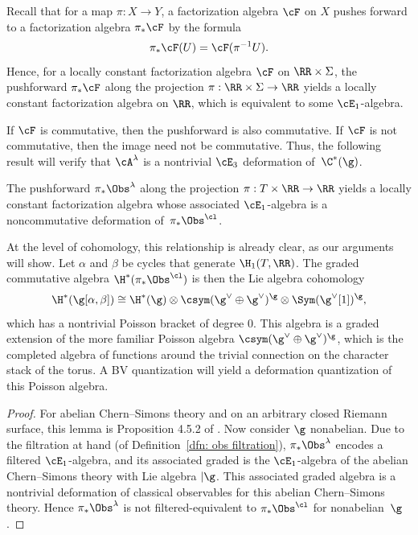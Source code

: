 \documentclass[10pt]{amsart}
\begin{document}
Recall that for a map $\pi: X \to Y$, 
a factorization algebra $\cF$ on $X$ pushes forward to a factorization algebra $\pi_* \cF$
by the formula 
\[
\pi_* \cF(U) = \cF(\pi^{-1}U).
\]
Hence, for a locally constant factorization algebra $\cF$ on $\RR \times \Sigma$,
the pushforward $\pi_* \cF$ along the projection $\pi: \RR \times \Sigma \to \RR$
yields a locally constant factorization algebra on $\RR$,
which is equivalent to some $\cE_1$-algebra.

If $\cF$ is commutative, then the pushforward is also commutative.
If $\cF$ is not commutative, then the image need not be commutative.
Thus, the following result will verify that $\cA^\lambda$ is a nontrivial $\cE_3$ deformation of~$\C^*(\g)$.

\begin{lmm}
\label{lmm: push to torus}
The pushforward $\pi_* \Obs^\lambda$ along the projection $\pi: T \times \RR \to \RR$ yields a locally constant factorization algebra
whose associated $\cE_1$-algebra is a noncommutative deformation of~$\pi_*\Obs^\cl$.
\end{lmm}

At the level of cohomology, this relationship is already clear, as our arguments will show. 
Let $\alpha$ and $\beta$ be cycles that generate $\H_1(T,\RR)$.
The graded commutative algebra $\H^*(\pi_*\Obs^\cl)$ is then the Lie algebra cohomology
\[
\H^*(\g[\alpha,\beta]) \cong \H^*(\g) \otimes \csym( \g^\vee \oplus \g^\vee)^\g \otimes \Sym(\g^\vee[1])^\g,
\]
which has a nontrivial Poisson bracket of degree 0.
This algebra is a graded extension of the more familiar Poisson algebra $\csym( \g^\vee \oplus \g^\vee)^\g$,
which is the completed algebra of functions around the trivial connection on the character stack of the torus.
A BV quantization will yield a deformation quantization of this Poisson algebra.

\begin{proof}
For abelian Chern--Simons theory and on an arbitrary closed Riemann surface,
this lemma is Proposition 4.5.2 of \cite{CG1}.
Now consider $\g$ nonabelian.
Due to the filtration at hand (of Definition~\ref{dfn: obs filtration}),
$\pi_* \Obs^\lambda$ encodes a filtered $\cE_1$-algebra,
and its associated graded is the $\cE_1$-algebra of the abelian Chern--Simons theory with Lie algebra $|\g$.
This associated graded algebra is a nontrivial deformation of classical observables for this abelian Chern--Simons theory. 
Hence $\pi_* \Obs^\lambda$ is not filtered-equivalent to $\pi_* \Obs^\cl$ for nonabelian~$\g$.
\end{proof}
\end{document}
